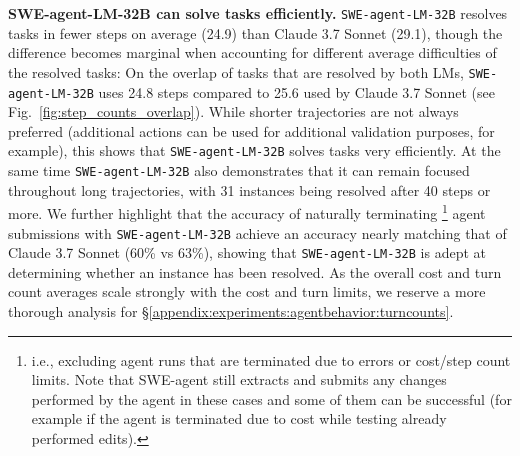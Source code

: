 \textbf{SWE-agent-LM-32B can solve tasks efficiently.} \texttt{SWE-agent-LM-32B} resolves tasks in fewer steps on average (24.9) than Claude 3.7 Sonnet (29.1), though the difference becomes marginal when accounting for different average difficulties of the resolved tasks: On the overlap of tasks that are resolved by both LMs, \texttt{SWE-agent-LM-32B} uses 24.8 steps compared to 25.6 used by Claude 3.7 Sonnet (see Fig.~\ref{fig:step_counts_overlap}).
While shorter trajectories are not always preferred (additional actions can be used for additional validation purposes, for example), this shows that \texttt{SWE-agent-LM-32B} solves tasks very efficiently.
At the same time \texttt{SWE-agent-LM-32B} also demonstrates that it can remain focused throughout long trajectories, with 31 instances being resolved after 40 steps or more.  
We further highlight that the accuracy of naturally terminating
\footnote{i.e., excluding agent runs that are terminated due to errors or cost/step count limits. Note that SWE-agent still extracts and submits any changes performed by the agent in these cases and some of them can be successful (for example if the agent is terminated due to cost while testing already performed edits).}
agent submissions with \texttt{SWE-agent-LM-32B} achieve an accuracy nearly matching that of Claude 3.7 Sonnet (60\% vs 63\%), showing that \texttt{SWE-agent-LM-32B} is adept at determining whether an instance has been resolved.
As the overall cost and turn count averages scale strongly with the cost and turn limits, we reserve a more thorough analysis for \S\ref{appendix:experiments:agentbehavior:turncounts}.


